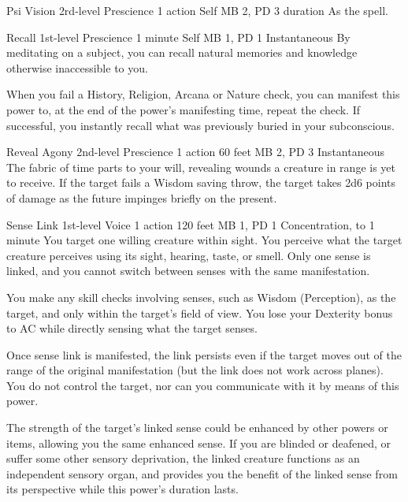\DndPowerHeader%
  {Psi Vision}
  {2rd-level Prescience}
  {1 action}
  {Self}
  {MB 2, PD 3}
  {duration}
As the  spell.

\DndPowerHeader%
  {Recall}
  {1st-level Prescience}
  {1 minute}
  {Self}
  {MB 1, PD 1}
  {Instantaneous}
By meditating on a subject, you can recall
natural memories and knowledge otherwise inaccessible to you.

When you fail a History, Religion, Arcana or Nature check,
you can manifest this power to, at the end of the
power's manifesting time, repeat the check.
If successful, you instantly recall
what was previously buried in your subconscious.

\DndPowerHeader%
  {Reveal Agony}
  {2nd-level Prescience}
  {1 action}
  {60 feet}
  {MB 2, PD 3}
  {Instantaneous}
  The fabric of time parts to your will,
  revealing wounds a creature in range is yet to receive.
  If the target fails a Wisdom saving throw,
  the target takes 2d6 points of damage as the future
  impinges briefly on the present.

\DndPowerHeader%
  {Sense Link}
  {1st-level Voice}
  {1 action}
  {120 feet}
  {MB 1, PD 1}
  {Concentration, to 1 minute}
  You target one willing creature within sight.
  You perceive what the target creature perceives using its sight,
  hearing, taste, or smell.
  Only one sense is linked,
  and you cannot switch between senses with the same manifestation.

  You make any skill checks involving senses,
  such as Wisdom (Perception), as the target,
  and only within the target's field of view.
  You lose your Dexterity bonus to AC while
  directly sensing what the target senses.
  
  Once sense link is manifested, the link persists
  even if the target moves out of the range
  of the original manifestation
  (but the link does not work across planes).
  You do not control the target,
  nor can you communicate with it by means of this power.
  
  The strength of the target's linked sense could be enhanced
  by other powers or items,
  allowing you the same enhanced sense.
  If you are blinded or deafened, or suffer some other sensory deprivation,
  the linked creature functions as an independent sensory organ,
  and provides you the benefit of the linked sense from its perspective
  while this power's duration lasts.

